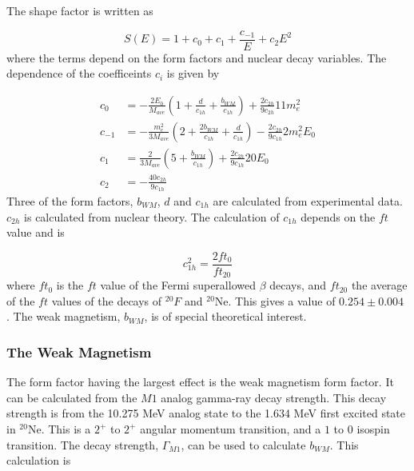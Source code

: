 \documentclass[../MaxHughesThesis.tex]{subfiles}
\begin{document}
The shape factor is written as 

\begin{equation}
	\label{eq:shapefactor}
	S(E) = 1 + c_{0} + c_{1} + \frac{c_{-1}}{E} + c_{2}E^{2}	
\end{equation}
where the terms depend on the form factors and nuclear decay variables.
The dependence of the coefficeints $c_{i}$ is given by\cite{Cal77}

\begin{equation}
	\label{eq:sfcs}
	\begin{split}
	c_{0} & = -\frac{2 E_{0}}{M_{ave}}(1 + \frac{d}{c_{1h}} + \frac{b_{WM}}{c_{1h}})  + \frac{2 c_{2h}}{9 c_{2h}} 11 m_{e}^{2} \\
	c_{-1} & = -\frac{m_{e}^{2}}{3M_{ave}} (2 + \frac{2b_{WM}}{c_{1h}} + \frac{d}{c_{1h}})  - \frac{2 c_{2h}}{9 c_{1h}} 2 m_{e}^{2} E_{0}\\
	c_{1} & =  \frac{2}{3M_{ave}} (5 + \frac{b_{WM}}{c_{1h}}) + \frac{2 c_{2h}}{9 c_{1h}} 20 E_{0} \\
	c_{2} & = -\frac{40 c_{2h}}{9 c_{1h}} 
	\end{split}
\end{equation}
Three of the form factors, $b_{WM}$, $d$ and $c_{1h}$ are calculated from experimental data. 
$c_{2h}$ is calculated from nuclear theory. 
The calculation of $c_{1h}$ depends on the $ft$ value and is \cite{Min11}

\begin{equation}
	c_{1h}^{2} = \frac{2 ft_{0}}{ft_{20}}
	\label{eq:c1eq}
\end{equation}
where $ft_{0}$ is the $ft$ value of the Fermi superallowed $\beta$ decays, and $ft_{20}$ the average of the $ft$ values of the decays of $^{20}F$ and $^{20}$Ne.
This gives a value of $0.254 \pm 0.004$ \cite{Min11}.
The weak magnetism, $b_{WM}$, is of special theoretical interest. 

\subsubsection{The Weak Magnetism}
The form factor having the largest effect is the weak magnetism form factor. 
It can be calculated from the $M1$ analog gamma-ray decay strength.
This decay strength is from the 10.275 MeV analog state to the 1.634 MeV first excited state in $^{20}$Ne.
This is a $2^{+}$ to $2^{+}$ angular momentum transition, and a $1$ to $0$ isospin transition.
The decay strength, $\Gamma_{M1}$, can be used to calculate $b_{WM}$.
This calculation is 
\end{document}
